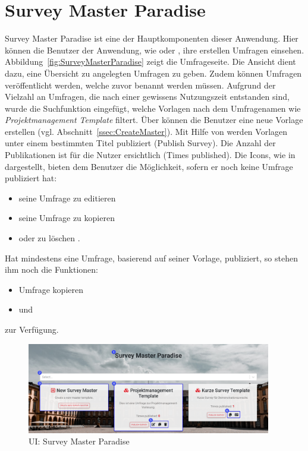 \section{Survey Master Paradise}
\label{ssec:SurveyMasterParadise}
Survey Master Paradise ist eine der Hauptkomponenten dieser Anwendung.
Hier können die Benutzer der Anwendung, wie \dutzi oder \ariane, ihre erstellen Umfragen einsehen.
Abbildung~\vref{fig:SurveyMasterParadise} zeigt die Umfrageseite. \newline
Die Ansicht dient dazu, eine Übersicht zu angelegten Umfragen zu geben.
Zudem können Umfragen veröffentlicht werden, welche zuvor benannt werden müssen.
Aufgrund der Vielzahl an Umfragen, die nach einer gewissens Nutzungszeit entstanden sind, wurde die Suchfunktion \desTwo eingefügt, welche Vorlagen nach dem Umfragenamen wie \zb \emph{Projektmanagement Template} filtert.
Über \desThree können die Benutzer eine neue Vorlage erstellen (vgl. Abschnitt~\vref{ssec:CreateMaster}). \newline
Mit Hilfe von \desFour werden Vorlagen unter einem bestimmten Titel publiziert (Publish Survey).
Die Anzahl der Publikationen ist für die Nutzer ersichtlich (Times published). \newline
Die Icons, wie in \desFive dargestellt, bieten dem Benutzer die Möglichkeit, sofern er noch keine Umfrage publiziert hat:
%
\begin{itemize}
    \item seine Umfrage zu editieren \faEdit
    \item seine Umfrage zu kopieren \faCopy
    \item oder zu löschen \faTrash.
\end{itemize}
%
Hat \zb \dutzi mindestens eine Umfrage, basierend auf seiner Vorlage, publiziert, so stehen ihm noch die Funktionen:
%
\begin{itemize}
    \item Umfrage kopieren \faCopy
    \item und \faIdCard
\end{itemize}
%
zur Verfügung.
%
\begin{figure}[H]
	\centering
	\includegraphics[width=0.95\textwidth, keepaspectratio]{img/guide/SurveyMasterParadise.png}
	\captionsetup{justification=centering, format=plain}
	\caption[\acl{UI}: Survey Master Paradise]{\acl{UI}: Survey Master Paradise \\\quelleScreenshot}
	\label{fig:SurveyMasterParadise}
\end{figure}
%
